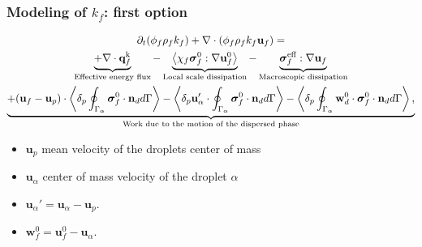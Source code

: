 \documentclass{sintefbeamer}
\begin{document}
\begin{frame}
  \frametitle{Modeling of $k_f$: first option}

\begin{multline}
  \partial_t (\phi_f\rho_fk_f)  
    + \mathbf{\nabla}\cdot (
        \phi_f\rho_fk_f\textbf{u}_f
        )
        = \\
      \underbrace{+ \mathbf{\nabla}\cdot  \textbf{q}_f^\text{k}}_\text{Effective energy flux}
    - \underbrace{\left<\chi_f\bm{\sigma}_f^0 : \mathbf{\nabla} \textbf{u}_f^0\right>}_\text{Local scale dissipation}
    - \underbrace{\bm{\sigma}_f^\text{eff} : \mathbf{\nabla} \textbf{u}_f}_\text{Macroscopic dissipation}
    \nonumber \\
    \underbrace{+ (\textbf{u}_f - \textbf{u}_p)\cdot \left<\delta_p \oint_{\Gamma_{\alpha}} {\bm{\sigma}_f^0 \cdot \textbf{n}_d} d\Gamma\right> 
    - \left<\delta_p  \textbf{u}_\alpha' \cdot \oint_{\Gamma_{\alpha}}   \bm{\sigma}_f^0 \cdot \textbf{n}_d d\Gamma\right>
    - \left<\delta_p  \oint_{\Gamma_{\alpha}} \textbf{w}_d^0 \cdot \bm{\sigma}_f^0 \cdot \textbf{n}_d d\Gamma\right>,}_\text{Work due to the motion of the dispersed phase}
\end{multline}



\begin{definition}
  \begin{itemize}
    \item $\textbf{u}_p$ mean velocity of the droplets center of mass
    \item $\textbf{u}_\alpha$ center of mass velocity of the droplet $\alpha$ 
    \item $\textbf{u}_\alpha' = \textbf{u}_\alpha - \textbf{u}_p$.   
    \item $\textbf{w}_f^0  = \textbf{u}_f^0 - \textbf{u}_\alpha$.  
  \end{itemize}
\end{definition}
\end{frame}
\end{document}
